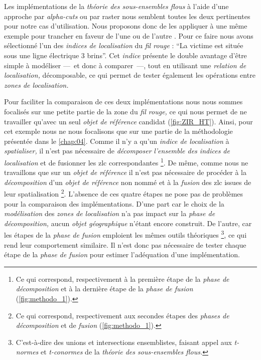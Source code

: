 Les implémentations de la \emph{théorie des sous-ensembles flous} à
l'aide d'une approche par \emph{alpha-cuts} ou par raster nous
semblent toutes les deux pertinentes pour notre cas
d'utilisation. Nous proposons donc de les appliquer à une même exemple
pour trancher en faveur de l'une ou de l'autre
\autocite{Bunel2019a}. Pour ce faire nous avons sélectionné l'un des
\emph{indices de localisation} du \emph{fil rouge} : \enquote{La
  victime est située sous une ligne électrique 3 brins}. Cet
\emph{indice} présente le double avantage d'être simple à modéliser
---~et donc à comparer~---, tout en utilisant une \emph{relation de
  localisation,} décomposable, ce qui permet de tester également les
opérations entre \emph{zones de localisation.}

Pour faciliter la comparaison de ces deux implémentations nous nous
sommes focalisés sur une petite partie de la zone du \emph{fil rouge,}
ce qui nous permet de ne travailler qu'avec un seul \emph{objet de
  référence} candidat (\autoref{fig:ZIR_HT}). Ainsi, pour cet exemple
nous ne nous focalisons que sur une partie de la méthodologie
présentée dans le \autoref{chap:04}. Comme il n'y a qu'un \emph{indice
  de localisation} à \emph{spatialiser,} il n'est pas nécessaire de
\emph{décomposer} \emph{l'ensemble des indices de localisation} et de
fusionner les zlc correspondantes \footnote{Ce qui
  correspond, respectivement à la première étape de la \emph{phase de
    décomposition} et à la dernière étape de la \emph{phase de fusion}
  (\autoref{fig:methodo_1}).}. De même, comme nous ne travaillons que
sur un \emph{objet de référence} il n'est pas nécessaire de procéder à
la \emph{décomposition} d'un \emph{objet de référence} non nommé et à
la \emph{fusion} des zlc issues de leur spatialisation
\footnote{Ce qui correspond, respectivement aux secondes étapes des
  \emph{phases de décomposition} et de \emph{fusion}
  (\autoref{fig:methodo_1}).}. L'absence de ces quatre étapes ne pose
pas de problèmes pour la comparaison des implémentations. D'une part
car le choix de la \emph{modélisation} des \emph{zones de
  localisation} n'a pas impact sur la \emph{phase de décomposition,}
aucun \emph{objet géographique} n'étant encore construit. De l'autre,
car les étapes de la \emph{phase de fusion} emploient les mêmes outils
théoriques \footnote{C'est-à-dire des unions et intersections
  ensemblistes, faisant appel aux \emph{t-normes} et \emph{t-conormes}
  de la \emph{théorie des sous-ensembles flous.}}, ce qui rend leur
comportement similaire. Il n'est donc pas nécessaire de tester chaque
étape de la \emph{phase de fusion} pour estimer l'adéquation d'une
implémentation.


